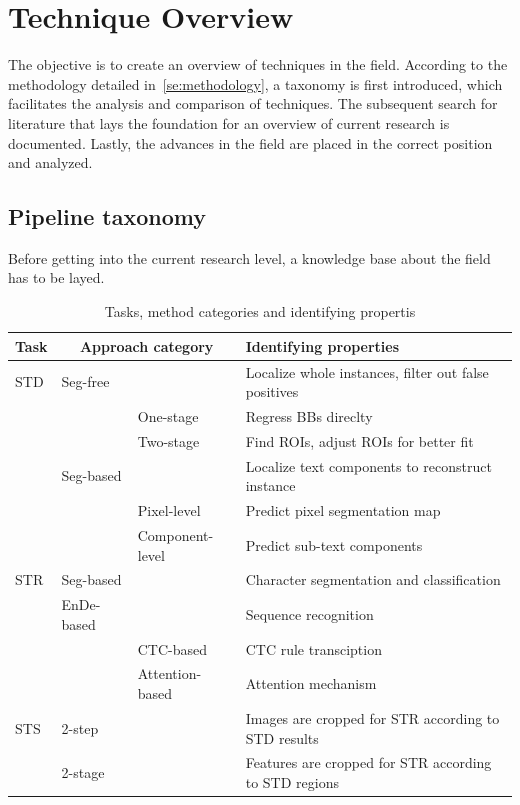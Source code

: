 \chapter{Technique Overview}\label{ch:research}
The objective is to create an overview of techniques in the field.
According to the methodology detailed in~\ref{se:methodology}, a taxonomy is first introduced,
which facilitates the analysis and comparison of techniques.
The subsequent search for literature that lays the foundation for an overview of current research
is documented.
Lastly, the advances in the field are placed in the correct position and analyzed.

\section{Pipeline taxonomy}\label{se:taxonomy}
Before getting into the current research level, a knowledge base about the field has to be layed.
\begin{table}[h]
    \centering\scriptsize
    \begin{tabular}{p{}p{}p{}p{}}
        \textbf{Task} & \multicolumn{2}{c}{\textbf{Approach category}}
                      & \textbf{Identifying properties} \\
        \toprule
        STD & Seg-free & & Localize whole instances, filter out false positives \\
            & & One-stage & Regress BBs direclty \\
            & & Two-stage & Find ROIs, adjust ROIs for better fit \\
            & Seg-based & & Localize text components to reconstruct instance \\
            & & Pixel-level & Predict pixel segmentation map\\
            & & Component-level & Predict sub-text components \\
        \midrule
        STR & Seg-based & & Character segmentation and classification\\
            & EnDe-based & & Sequence recognition \\
            & & CTC-based & CTC rule transciption \\
            & & Attention-based & Attention mechanism \\
        \midrule
        STS & 2-step & & Images are cropped for STR according to STD results \\
            & 2-stage & & Features are cropped for STR according to STD regions \\
        \bottomrule
    \end{tabular}
    \caption{Tasks, method categories and identifying propertis\label{tb:steps-properties}}
\end{table}
